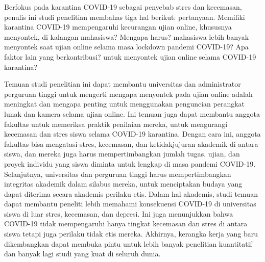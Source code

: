 Berfokus pada karantina COVID-19 sebagai penyebab stres dan kecemasan, penulis ini studi penelitian membahas tiga hal berikut: pertanyaan. Memiliki karantina COVID-19 mempengaruhi kecurangan ujian online, khususnya menyontek, di kalangan mahasiswa? Mengapa harus? mahasiswa lebih banyak menyontek saat ujian online selama masa lockdown pandemi COVID-19? Apa faktor lain yang berkontribusi? untuk menyontek ujian online selama COVID-19 karantina?

Temuan studi penelitian ini dapat membantu universitas dan administrator perguruan tinggi untuk mengerti mengapa menyontek pada ujian online adalah meningkat dan mengapa penting untuk menggunakan penguncian perangkat lunak dan kamera selama ujian online. Ini temuan juga dapat membantu anggota fakultas untuk memeriksa praktik penilaian mereka, untuk mengurangi kecemasan dan stres siswa selama COVID-19 karantina. Dengan cara ini, anggota fakultas bisa mengatasi stres, kecemasan, dan ketidakjujuran akademik di antara siswa, dan mereka juga harus mempertimbangkan jumlah tugas, ujian, dan proyek individu yang siswa diminta untuk lengkap di masa pandemi COVID-19. Selanjutnya, universitas dan perguruan tinggi harus mempertimbangkan integritas akademik dalam silabus mereka, untuk menciptakan budaya yang dapat diterima secara akademis perilaku etis. Dalam hal akademis, studi temuan dapat membantu peneliti lebih memahami konsekuensi COVID-19 di universitas siswa di luar stres, kecemasan, dan depresi. Ini juga menunjukkan bahwa COVID-19 tidak mempengaruhi hanya tingkat kecemasan dan stres di antara siswa tetapi juga perilaku tidak etis mereka. Akhirnya, kerangka kerja yang baru dikembangkan dapat membuka pintu untuk lebih banyak penelitian kuantitatif dan banyak lagi studi yang kuat di seluruh dunia.

